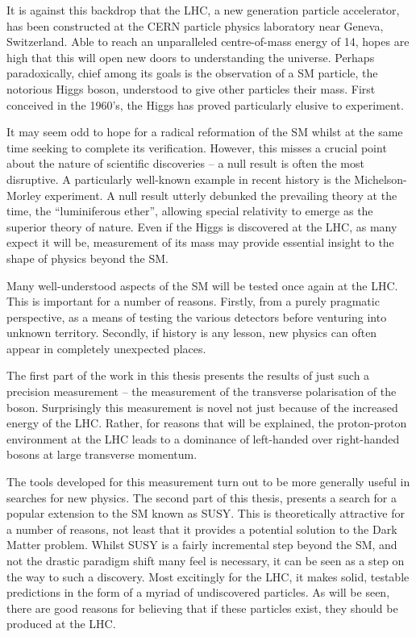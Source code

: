 It is against this backdrop that the \ac{LHC}, a new generation particle
accelerator, has been constructed at the \ac{CERN} particle physics laboratory
near Geneva, Switzerland. Able to reach an unparalleled centre-of-mass energy of
\unit{14}{\TeV}, hopes are high that this will open new doors to understanding
the universe. Perhaps paradoxically, chief among its goals is the observation of
a \ac{SM} particle, the notorious Higgs boson, understood to give other
particles their mass. First conceived in the 1960's, the Higgs has proved
particularly elusive to experiment.

It may seem odd to hope for a radical reformation of the \ac{SM} whilst at the
same time seeking to complete its verification. However, this misses a crucial
point about the nature of scientific discoveries -- a null result is often the
most disruptive. A particularly well-known example in recent history is the
Michelson-Morley experiment. A null result utterly debunked the prevailing
theory at the time, the ``luminiferous ether'', allowing special relativity to
emerge as the superior theory of nature. Even if the Higgs is discovered at the
\ac{LHC}, as many expect it will be, measurement of its mass may provide
essential insight to the shape of physics beyond the \ac{SM}.

Many well-understood aspects of the \ac{SM} will be tested once again at the
\ac{LHC}. This is important for a number of reasons. Firstly, from a purely
pragmatic perspective, as a means of testing the various detectors before
venturing into unknown territory. Secondly, if history is any lesson, new
physics can often appear in completely unexpected places.

The first part of the work in this thesis presents the results of just such a
precision measurement -- the measurement of the transverse polarisation of the
\PW boson. Surprisingly this measurement is novel not just because of the
increased energy of the \ac{LHC}. Rather, for reasons that will be explained,
the proton-proton environment at the \ac{LHC} leads to a dominance of
left-handed over right-handed \PW bosons at large transverse momentum.

The tools developed for this measurement turn out to be more generally useful in
searches for new physics. The second part of this thesis, presents a search for
a popular extension to the \ac{SM} known as \acl{SUSY}. This is theoretically
attractive for a number of reasons, not least that it provides a potential
solution to the Dark Matter problem. Whilst \ac{SUSY} is a fairly incremental
step beyond the \ac{SM}, and not the drastic paradigm shift many feel is
necessary, it can be seen as a step on the way to such a discovery. Most
excitingly for the \ac{LHC}, it makes solid, testable predictions in the form of
a myriad of undiscovered particles. As will be seen, there are good reasons for
believing that if these particles exist, they should be produced at the
\ac{LHC}.

